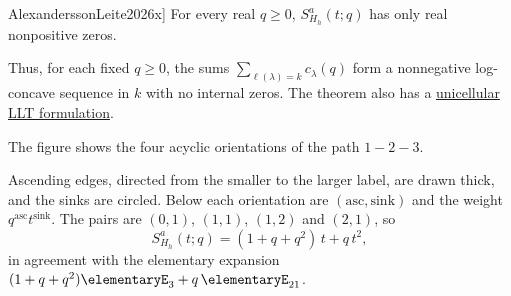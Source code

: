 \begin{theorem}[Alexandersson--Leite, \cite[Thm.~5.2]{AlexanderssonLeite2026x}]
For every real $q\geq0$, $S^a_{H_h}(t;q)$ has only real nonpositive zeros.
\end{theorem}

Thus, for each fixed $q\geq0$, the sums
$\sum_{\ell(\lambda)=k}c_\lambda(q)$ form a nonnegative log-concave sequence
in $k$ with no internal zeros.
The theorem also has a
\hyperref[unicellularLLTSinkSpecialization]{unicellular LLT formulation}.

\begin{example*}
The figure shows the four acyclic orientations of the path $1-2-3$.
\begin{figure}
\end{figure}
Ascending edges, directed from the smaller to the larger label, are drawn
thick, and the sinks are circled.  Below each orientation are
$(\mathrm{asc},\mathrm{sink})$ and the weight $q^{\mathrm{asc}}t^{\mathrm{sink}}$.
The pairs are $(0,1)$, $(1,1)$, $(1,2)$ and $(2,1)$, so
\[
S^a_{H_h}(t;q)=(1+q+q^2)\,t+q\,t^2,
\]
in agreement with the elementary expansion
$(1+q+q^2)\elementaryE_3+q\,\elementaryE_{21}$.
\end{example*}
